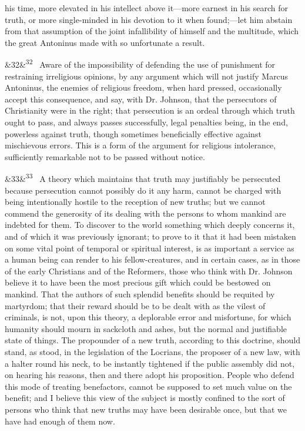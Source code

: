 \documentclass[12pt]{article}
\newcommand{\para}[1][]{\par\noindent\ifx&#1&\else\textsuperscript{\footnotesize #1}~\fi}
\begin{document}
his time, more elevated in his intellect above it---more earnest in his search for truth, or more single-minded in his devotion to it when found;---let him abstain from that assumption of the joint infallibility of himself and the multitude, which the great Antoninus made with so unfortunate a result.

\para[32] Aware of the impossibility of defending the use of punishment for restraining irreligious opinions, by any argument which will not justify Marcus Antoninus, the enemies of religious freedom, when hard pressed, occasionally accept this consequence, and say, with Dr. Johnson, that the persecutors of Christianity were in the right; that persecution is an ordeal through which truth ought to pass, and always passes successfully, legal penalties being, in the end, powerless against truth, though sometimes beneficially effective against mischievous errors. This is a form of the argument for religious intolerance, sufficiently remarkable not to be passed without notice.

\para[33] A theory which maintains that truth may justifiably be persecuted because persecution cannot possibly do it any harm, cannot be charged with being intentionally hostile to the reception of new truths; but we cannot commend the generosity of its dealing with the persons to whom mankind are indebted for them. To discover to the world something which deeply concerns it, and of which it was previously ignorant; to prove to it that it had been mistaken on some vital point of temporal or spiritual interest, is as important a service as a human being can render to his fellow-creatures, and in certain cases, as in those of the early Christians and of the Reformers, those who think with Dr. Johnson believe it to have been the most precious gift which could be bestowed on mankind. That the authors of such splendid benefits should be requited by martyrdom; that their reward should be to be dealt with as the vilest of criminals, is not, upon this theory, a deplorable error and misfortune, for which humanity should mourn in sackcloth and ashes, but the normal and justifiable state of things. The propounder of a new truth, according to this doctrine, should stand, as stood, in the legislation of the Locrians, the proposer of a new law, with a halter round his neck, to be instantly tightened if the public assembly did not, on hearing his reasons, then and there adopt his proposition. People who defend this mode of treating benefactors, cannot be supposed to set much value on the benefit; and I believe this view of the subject is mostly confined to the sort of persons who think that new truths may have been desirable once, but that we have had enough of them now.
\end{document}
